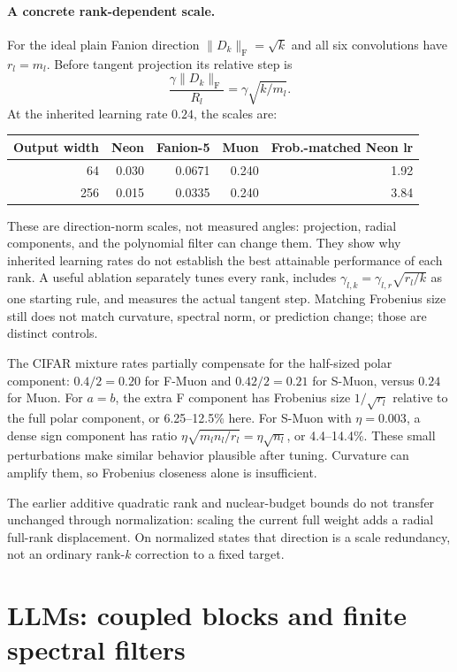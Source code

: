 \documentclass[11pt]{article}
\newcommand{\F}[1]{\lVert #1\rVert_{\mathrm F}}
\begin{document}
\paragraph{A concrete rank-dependent scale.}
For the ideal plain Fanion direction $\F{D_k}=\sqrt{k}$ and all six
convolutions have $r_l=m_l$. Before tangent projection its relative step is
\begin{equation}\label{eq:rank-step}
 \frac{\gamma\F{D_k}}{R_l}=\gamma\sqrt{k/m_l}.
\end{equation}
At the inherited learning rate $0.24$, the scales are:
\begin{center}
\begin{tabular}{rrrrr}
\toprule
Output width & Neon & Fanion-5 & Muon & Frob.-matched Neon lr\\
\midrule
64 & 0.030 & 0.0671 & 0.240 & 1.92\\
256 & 0.015 & 0.0335 & 0.240 & 3.84\\
\bottomrule
\end{tabular}
\end{center}
These are direction-norm scales, not measured angles: projection, radial
components, and the polynomial filter can change them. They show why
inherited learning rates do not establish the best attainable performance
of each rank. A useful ablation separately tunes every rank, includes
$\gamma_{l,k}=\gamma_{l,r}\sqrt{r_l/k}$ as one starting rule, and measures
the actual tangent step. Matching Frobenius size still does not match
curvature, spectral norm, or prediction change; those are distinct controls.

The CIFAR mixture rates partially compensate for the half-sized polar
component: $0.4/2=0.20$ for F-Muon and $0.42/2=0.21$ for S-Muon, versus
$0.24$ for Muon. For $a=b$, the extra F component has Frobenius size
$1/\sqrt{r_l}$ relative to the full polar component, or 6.25--12.5\% here.
For S-Muon with $\eta=0.003$, a dense sign component has ratio
$\eta\sqrt{m_ln_l/r_l}=\eta\sqrt{n_l}$, or 4.4--14.4\%.
These small perturbations make similar behavior plausible after tuning.
Curvature can amplify them, so Frobenius closeness alone is insufficient.

The earlier additive quadratic rank and nuclear-budget bounds do not
transfer unchanged through normalization: scaling the current full weight
adds a radial full-rank displacement. On normalized states that direction
is a scale redundancy, not an ordinary rank-$k$ correction to a fixed target.

\section{LLMs: coupled blocks and finite spectral filters}
\end{document}
